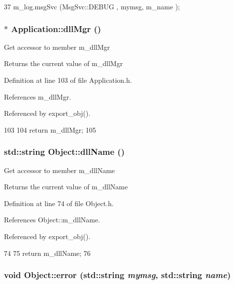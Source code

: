 \begin{DoxyCode}
37 { m_log.msgSvc (MsgSvc::DEBUG   , mymsg, m_name ); }
\end{DoxyCode}
\hypertarget{classApplication_a0133c161bf55544f268ca039e174060b}{
\subsubsection[{dllMgr}]{$\ast$ Application::dllMgr ()}}
\label{classApplication_a0133c161bf55544f268ca039e174060b}
Get accessor to member m\_\-dllMgr \begin{DoxyReturn}{Returns}
the current value of m\_\-dllMgr 
\end{DoxyReturn}


Definition at line 103 of file Application.h.

References m\_\-dllMgr.

Referenced by export\_\-obj().


\begin{DoxyCode}
103                     {
104     return m_dllMgr;
105   }
\end{DoxyCode}
\hypertarget{classObject_a2e3947f2870094c332d7454117f3ec63}{
\subsubsection[{dllName}]{\setlength{\rightskip}{0pt plus 5cm}std::string Object::dllName ()}}
\label{classObject_a2e3947f2870094c332d7454117f3ec63}
Get accessor to member m\_\-dllName \begin{DoxyReturn}{Returns}
the current value of m\_\-dllName 
\end{DoxyReturn}


Definition at line 74 of file Object.h.

References Object::m\_\-dllName.

Referenced by export\_\-obj().


\begin{DoxyCode}
74                        {
75     return m_dllName;
76   }  
\end{DoxyCode}
\hypertarget{classObject_ad7f6c457733082efa2f9ff5f5c8e119a}{
\subsubsection[{error}]{\setlength{\rightskip}{0pt plus 5cm}void Object::error (std::string {\em mymsg}, \/  std::string {\em name})}}
\label{classObject_ad7f6c457733082efa2f9ff5f5c8e119a}


